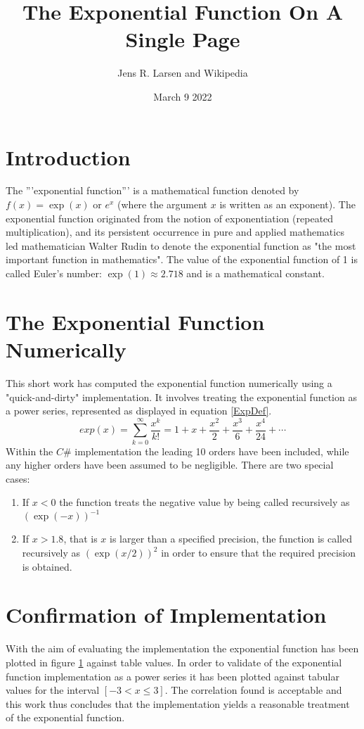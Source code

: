 \documentclass[twocolumn,a4paper]{article}
\begin{document}
\title{The Exponential Function On A Single Page}
\author{Jens R. Larsen and Wikipedia}
\date{March 9 2022}
\maketitle

\section{Introduction}
The '''exponential function''' is a mathematical function denoted by $f(x)=\exp(x)$ or $e^x$ (where the argument $x$ is written as an exponent). The exponential function originated from the notion of exponentiation (repeated multiplication), and its persistent occurrence in pure and applied mathematics led mathematician Walter Rudin to denote the exponential function as "the most important function in mathematics". The value of the exponential function of 1 is called Euler's number: $\exp(1)\approx2.718$ and is a mathematical constant.

\section{The Exponential Function Numerically}
This short work has computed the exponential function numerically using a "quick-and-dirty" implementation. It involves treating the exponential function as a power series, represented as displayed in equation \ref{ExpDef}.
\begin{equation} \label{ExpDef}
	exp(x)  = \sum_{k = 0}^{\infty} \frac{x^k}{k!} = 1 + x + \frac{x^2}{2} + \frac{x^3}{6} + \frac{x^4}{24} +	\cdots
\end{equation}
Within the $C\#$ implementation the leading 10 orders have been included, while any higher orders have been assumed to be negligible. There are two special cases:
\begin{enumerate}
	\item If $x<0$ the function treats the negative value by being called recursively as $\left(\exp(-x)\right)^{-1}$
	\item If $x>1.8$, that is $x$ is larger than a specified precision, the function is called recursively as  
$\left(\exp(x/2)\right)^{2}$ in order to ensure that the required precision is obtained.
\end{enumerate}
\begin{figure}[h] \label{ExpPlot}
	
\end{figure}
\section{Confirmation of Implementation}
With the aim of evaluating the implementation the exponential function has been plotted in figure \ref{ExpPlot} against table values. In order to validate of the exponential function implementation as a power series it has been plotted against tabular values for the interval $[-3<x\leq3]$. The correlation found is acceptable and this work thus concludes that the implementation yields a reasonable treatment of the exponential function.
\end{document}
